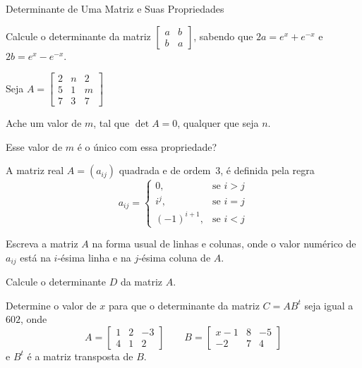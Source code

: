 \begin{exercicios}{Determinante de Uma Matriz e Suas Propriedades}
    \begin{exercicio}
        Calcule o determinante da matriz 
        \( \left[\begin{array}{cc}
        	a & b \\
        	b & a
        \end{array} \right] \), 
        sabendo que $2a = e^x + e^{-x}$ e $2b = e^x - e ^{-x}$.
    \end{exercicio}
    
    \begin{exercicio}
        Seja \( A = \left[\begin{array}{ccc}
        	2 & n & 2 \\
        	5 & 1 & m \\
        	7 & 3 & 7
        \end{array} \right] \)
        \begin{alphalist}
            \item Ache um valor de $m$, tal que $\det A = 0$, qualquer que seja $n$.
            \item Esse valor de $m$ é o único com essa propriedade?
        \end{alphalist}
    \end{exercicio}
    
    \begin{exercicio}
        A matriz real $A = (a_{ij})$ quadrada e de ordem~3, é definida pela regra
        \[a_{ij} = \begin{cases}
        	0,            & \text{se } i > j \\
        	i^j,          & \text{se } i = j \\
        	(-1)^{i + 1}, & \text{se } i < j
        \end{cases}\]
        \begin{alphalist}
            \item Escreva a matriz $A$ na forma usual de linhas e colunas, onde o valor numérico de $a_{ij}$ está na $i$-ésima linha e na $j$-ésima coluna de $A$.
            \item Calcule o determinante $D$ da matriz $A$.
        \end{alphalist}
    \end{exercicio}
    
    \begin{exercicio}
        Determine o valor de $x$ para que o determinante da matriz $C = AB^t$ seja igual a $602$, onde
        \[A = \left[\begin{array}{rrr}
        	1 & 2 & -3 \\
        	4 & 1 &  2
        \end{array} \right]
        \qquad
        B = \left[\begin{array}{crr}
        	x - 1 & 8 & -5 \\
        	 -2   & 7 &  4
        \end{array} \right]\]
        e $B^t$ é a matriz transposta de $B$.
    \end{exercicio}
    

\end{exercicios}
